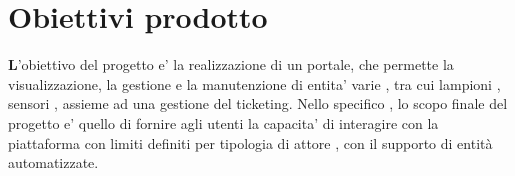 \chapter{Obiettivi prodotto}

\textbf L’obiettivo del progetto e' la realizzazione di un portale, che permette la visualizzazione, la gestione e la manutenzione
di entita' varie , tra cui lampioni , sensori , assieme ad una gestione del ticketing.
Nello specifico , lo scopo finale del progetto e' quello di fornire agli utenti la capacita' di interagire con la
piattaforma con limiti definiti per tipologia di attore , con il supporto di entità automatizzate.
